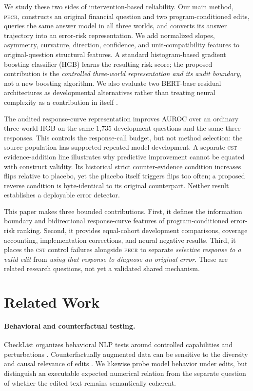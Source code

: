 \documentclass[11pt]{article}
\newcommand{\PECR}{\textsc{pecr}}
\newcommand{\CST}{\textsc{cst}}
\begin{document}
We study these two sides of intervention-based reliability. Our main method, \PECR{}, constructs an original financial question and two program-conditioned edits, queries the same answer model in all three worlds, and converts its answer trajectory into an error-risk representation. We add normalized slopes, asymmetry, curvature, direction, confidence, and unit-compatibility features to original-question structural features. A standard histogram-based gradient boosting classifier (HGB) learns the resulting risk score; the proposed contribution is the \emph{controlled three-world representation and its audit boundary}, not a new boosting algorithm. We also evaluate two BERT-base residual architectures as developmental alternatives rather than treating neural complexity as a contribution in itself \citep{devlin-etal-2019-bert}.

The audited response-curve representation improves AUROC over an ordinary three-world HGB on the same 1,735 development questions and the same three responses. This controls the response-call budget, but not method selection: the source population has supported repeated model development. A separate \CST{} evidence-addition line illustrates why predictive improvement cannot be equated with construct validity. Its historical strict counter-evidence condition increases flips relative to placebo, yet the placebo itself triggers flips too often; a proposed reverse condition is byte-identical to its original counterpart. Neither result establishes a deployable error detector.

This paper makes three bounded contributions. First, it defines the information boundary and bidirectional response-curve features of program-conditioned error-risk ranking. Second, it provides equal-cohort development comparisons, coverage accounting, implementation corrections, and neural negative results. Third, it places the \CST{} control failures alongside \PECR{} to separate \emph{selective response to a valid edit} from \emph{using that response to diagnose an original error}. These are related research questions, not yet a validated shared mechanism.

\section{Related Work}
\paragraph{Behavioral and counterfactual testing.}
CheckList organizes behavioral NLP tests around controlled capabilities and perturbations \citep{ribeiro-etal-2020-beyond}. Counterfactually augmented data can be sensitive to the diversity and causal relevance of edits \citep{joshi-he-2022-investigation}. We likewise probe model behavior under edits, but distinguish an executable expected numerical relation from the separate question of whether the edited text remains semantically coherent.
\end{document}
